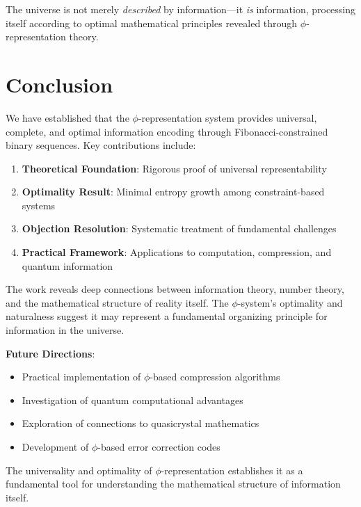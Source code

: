 \documentclass[12pt,letterpaper]{article}
\begin{document}
The universe is not merely \textit{described} by information—it \textit{is} information, processing itself according to optimal mathematical principles revealed through $\phi$-representation theory.

\section{Conclusion}

We have established that the $\phi$-representation system provides universal, complete, and optimal information encoding through Fibonacci-constrained binary sequences. Key contributions include:

\begin{enumerate}
\item \textbf{Theoretical Foundation}: Rigorous proof of universal representability
\item \textbf{Optimality Result}: Minimal entropy growth among constraint-based systems  
\item \textbf{Objection Resolution}: Systematic treatment of fundamental challenges
\item \textbf{Practical Framework}: Applications to computation, compression, and quantum information
\end{enumerate}

The work reveals deep connections between information theory, number theory, and the mathematical structure of reality itself. The $\phi$-system's optimality and naturalness suggest it may represent a fundamental organizing principle for information in the universe.

\textbf{Future Directions}:
\begin{itemize}
\item Practical implementation of $\phi$-based compression algorithms
\item Investigation of quantum computational advantages
\item Exploration of connections to quasicrystal mathematics
\item Development of $\phi$-based error correction codes
\end{itemize}

The universality and optimality of $\phi$-representation establishes it as a fundamental tool for understanding the mathematical structure of information itself.



\end{document}
